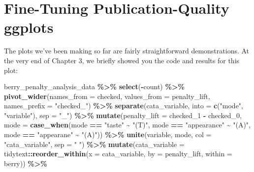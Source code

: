 \documentclass[
]{book}
\newenvironment{Shaded}{\begin{snugshade}}{\end{snugshade}}
\newcommand{\AttributeTok}[1]{\textcolor[rgb]{0.13,0.29,0.53}{#1}}
\newcommand{\FunctionTok}[1]{\textcolor[rgb]{0.13,0.29,0.53}{\textbf{#1}}}
\newcommand{\NormalTok}[1]{#1}
\newcommand{\SpecialCharTok}[1]{\textcolor[rgb]{0.81,0.36,0.00}{\textbf{#1}}}
\newcommand{\StringTok}[1]{\textcolor[rgb]{0.31,0.60,0.02}{#1}}
\begin{document}
\hypertarget{fine-tuning-publication-quality-ggplots}{%
\chapter{Fine-Tuning Publication-Quality ggplots}\label{fine-tuning-publication-quality-ggplots}}

The plots we've been making so far are fairly straightforward demonstrations. At the very end of Chapter 3, we briefly showed you the code and results for this plot:

\begin{Shaded}
\begin{Highlighting}[]
\NormalTok{berry\_penalty\_analysis\_data }\SpecialCharTok{\%\textgreater{}\%}
  \FunctionTok{select}\NormalTok{(}\SpecialCharTok{{-}}\NormalTok{count) }\SpecialCharTok{\%\textgreater{}\%}
  \FunctionTok{pivot\_wider}\NormalTok{(}\AttributeTok{names\_from =}\NormalTok{ checked,}
              \AttributeTok{values\_from =}\NormalTok{ penalty\_lift,}
              \AttributeTok{names\_prefix =} \StringTok{"checked\_"}\NormalTok{) }\SpecialCharTok{\%\textgreater{}\%}
  \FunctionTok{separate}\NormalTok{(cata\_variable, }
           \AttributeTok{into =} \FunctionTok{c}\NormalTok{(}\StringTok{"mode"}\NormalTok{, }\StringTok{"variable"}\NormalTok{), }
           \AttributeTok{sep =} \StringTok{"\_"}\NormalTok{) }\SpecialCharTok{\%\textgreater{}\%}
  \FunctionTok{mutate}\NormalTok{(}\AttributeTok{penalty\_lift =}\NormalTok{ checked\_1 }\SpecialCharTok{{-}}\NormalTok{ checked\_0,}
         \AttributeTok{mode =} \FunctionTok{case\_when}\NormalTok{(mode }\SpecialCharTok{==} \StringTok{"taste"} \SpecialCharTok{\textasciitilde{}} \StringTok{"(T)"}\NormalTok{,}
\NormalTok{                          mode }\SpecialCharTok{==} \StringTok{"appearance"} \SpecialCharTok{\textasciitilde{}} \StringTok{"(A)"}\NormalTok{,}
\NormalTok{                          mode }\SpecialCharTok{==} \StringTok{"appearane"} \SpecialCharTok{\textasciitilde{}} \StringTok{"(A)"}\NormalTok{)) }\SpecialCharTok{\%\textgreater{}\%}
  \FunctionTok{unite}\NormalTok{(variable, mode, }\AttributeTok{col =} \StringTok{"cata\_variable"}\NormalTok{, }\AttributeTok{sep =} \StringTok{" "}\NormalTok{) }\SpecialCharTok{\%\textgreater{}\%}
  \FunctionTok{mutate}\NormalTok{(}\AttributeTok{cata\_variable =}\NormalTok{ tidytext}\SpecialCharTok{::}\FunctionTok{reorder\_within}\NormalTok{(}\AttributeTok{x =}\NormalTok{ cata\_variable,}
                                                  \AttributeTok{by =}\NormalTok{ penalty\_lift,}
                                                  \AttributeTok{within =}\NormalTok{ berry)) }\SpecialCharTok{\%\textgreater{}\%}

\end{Highlighting}
\end{Shaded}
\end{document}
